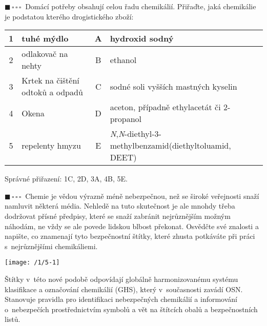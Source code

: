 \documentclass{book}
\newcommand{\jeden}{$\blacksquare \, \square \, \square \, \square \; \; $}
\renewenvironment{quotation}{\par}{\par} %
\begin{document}
\hrulefill %
\begin{quotation}
\jeden Domácí potřeby obsahují celou řadu chemikálií. Přiřaďte, jaká chemikálie
je podstatou kterého drogistického zboží: 
\begin{center}
\begin{tabular}{c|p{5.5cm}||c|p{7cm}}
1 & tuhé mýdlo & A & hydroxid sodný\tabularnewline
\hline
2 & odlakovač na nehty & B & ethanol\tabularnewline
\hline
3 & Krtek na čištění odtoků a odpadů & C & sodné soli vyšších mastných kyselin\tabularnewline
\hline
4 & Okena & D & aceton, případně ethylacetát či 2-propanol\tabularnewline
\hline
5 & repelenty hmyzu & E & \textit{N},\textit{N}-diethyl-3-methylbenzamid\newline(diethyltoluamid, DEET)\tabularnewline

\end{tabular}
\end{center}
\end{quotation} \dotfill \par 
Správné přiřazení: 1C, 2D, 3A, 4B, 5E.

\newpage %
\begin{quotation}
\jeden Chemie je vědou výrazně méně nebezpečnou, než se široké veřejnosti
snaží namluvit některá média. Nehledě na tuto skutečnost je ale mnohdy třeba
dodržovat přísné předpisy, které se snaží zabránit nejrůznějším možným
náhodám, ne vždy se ale povede lidskou blbost překonat. Osvědčte své
znalosti a napište, co znamenají tyto bezpečnostní štítky, které zhusta
potkáváte při práci s~nejrůznějšími chemikáliemi.
\end{quotation} \dotfill \par 
\begin{center}
\texttt{[image: /1/5-1]}
\end{center}

Štítky v~této nové podobě odpovídají globálně harmonizovanému systému
klasifikace a označování chemikálií (GHS), který v~současnosti zavádí
OSN. Stanovuje pravidla pro identifikaci nebezpečných chemikálií a
informování o~nebezpečích prostřednictvím symbolů a vět na štítcích
obalů a bezpečnostních listů. 
\end{document}
